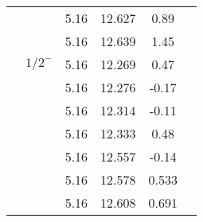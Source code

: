 \documentclass[prd,twocolumn,floatfix,nofootinbib]{revtex4}
\begin{document}
\begin{table*}[!htbp]
\begin{tabular}{cccccc}
                         &$ $     &5.16   &12.627 &0.89 \\
                         &$ $     &5.16   &12.639 &1.45 \\
            &${1/2}^{-}$     &5.16   &12.269 &0.47 \\
                         &$ $     &5.16   &12.276 &-0.17  \\
                         &$ $     &5.16   &12.314 &-0.11  \\
                         &$ $     &5.16   &12.333 &0.48  \\
                         &$ $     &5.16   &12.557 &-0.14  \\
                         &$ $     &5.16   &12.578 &0.533 \\
                         &$ $     &5.16   &12.608 &0.691 \\
       \hline\hline
    \end{tabular}
\end{table*}
\end{document}
